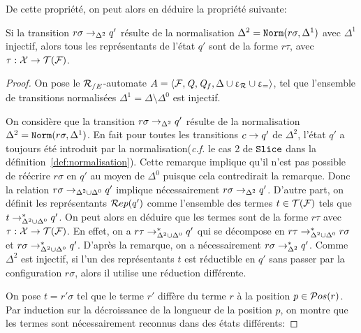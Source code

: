 De cette propriété, on peut alors en déduire la propriété suivante: 
\begin{property}
  \label{prop:norm_representant}
  Si la transition $r\sigma \rightarrow_{\Delta^2} q'$ résulte de la normalisation $\Delta^2=\mathtt{Norm}(r\sigma, \Delta^1)$
  avec $\Delta^1$ injectif, alors tous les représentants de l'état $q'$ sont de la forme $r\tau$, 
  avec $\tau: \mathcal X \rightarrow \mathcal{T(F)}$.
\end{property}

\begin{proof}
  On pose le ${\mathcal R_{/E}}$-automate $A = \langle \mathcal{F}, \mathit Q, \mathit Q_f, \Delta \cup \upvarepsilon_{\mathcal R} \cup \upvarepsilon_{=}\rangle$,
  tel que l'ensemble de transitions normalisées $\Delta^1 = \Delta \setminus \Delta^0$ est injectif.
  
  On considère que la transition $r\sigma \rightarrow_{\Delta^2} q'$ résulte de la normalisation $\Delta^2=\mathtt{Norm}(r\sigma, \Delta^1)$.
  En fait pour toutes les transitions $c \rightarrow q'$ de $\Delta^2$, l'état $q'$ a toujours été introduit 
  par la normalisation(\textit{c.f.} le cas 2 de $\mathtt{Slice}$ dans la définition~\ref{def:normalisation}). Cette remarque implique
  qu'il n'est pas possible de réécrire $r\sigma$ en $q'$ au moyen de $\Delta^0$ puisque cela contredirait
  la remarque. Donc la relation $r\sigma \rightarrow_{\Delta^2 \cup \Delta^0} q'$ implique nécessairement $r\sigma \rightarrow_{\Delta^2} q'$.
  D'autre part, on définit les représentants $\mathcal R ep(q')$ comme l'ensemble des termes $t \in \mathcal{T(F)}$ tels que $t \rightarrow^*_{\Delta^2 \cup \Delta^0} q'$.
  On peut alors en déduire que les termes sont de la forme $r\tau$ avec $\tau: \mathcal X \rightarrow \mathcal{T(F)}$.
  En effet, on a $r\tau\rightarrow^*_{\Delta^2 \cup \Delta^0} q'$ qui se décompose en $r\tau\rightarrow^*_{\Delta^2 \cup \Delta^0} r\sigma$
  et $r\sigma \rightarrow^*_{\Delta^2 \cup \Delta^0} q'$. D'après la remarque, on a nécessairement $r\sigma \rightarrow^*_{\Delta^2} q'$.
  Comme $\Delta^2$ est injectif, si l'un des représentants $t$ est réductible en $q'$ sans passer par la configuration 
  $r\sigma$, alors il utilise une réduction différente. 

  On pose $t = r'\sigma$ tel que le terme $r'$ diffère du terme $r$ à la position $p\in \mathcal{ P}os(r)$.
  Par induction sur la décroissance de la longueur de la position $p$, 
  on montre que les termes sont nécessairement reconnus dans des états différents:


\end{proof}
